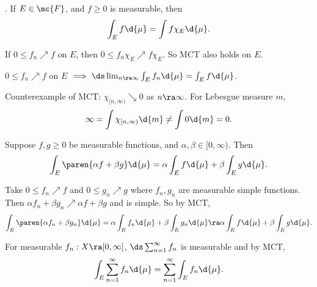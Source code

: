 \bigskip

. If \(E \in \mc{F}\), and \(f \geq 0\) is measurable, then
\[
    \int_E f \d{\mu} = \int f \chi_{E} \d{\mu}.
\]

\rmk If \(0 \leq f_n \nearrow f\) on \(E\), then \(0\leq f_n \chi_E \nearrow f \chi_E\). So MCT also holds on \(E\).
\begin{center}
    \(0\leq f_n \nearrow f\) on \(E\) \(\implies \ds \lim_{n\ra\infty} \int_E f_n \d{\mu} = \int_E f \d{\mu}\).
\end{center}

\rmk Counterexample of MCT: \(\chi_{[n, \infty)} \searrow 0\) as \(n \ra \infty\). For Lebesgue measure \(m\),
\[
    \infty = \int \chi_{[n, \infty)} \d{m} \neq \int 0 \d{m} = 0.
\]

\rmk Suppose \(f, g \geq 0\) be measurable functions, and \(\alpha, \beta \in [0, \infty)\). Then
\[
    \int_E \paren{\alpha f + \beta g} \d{\mu} = \alpha \int_E f \d{\mu} + \beta \int_E g\d{\mu}.
\]

\pf Take \(0 \leq f_n \nearrow f\) and \(0 \leq g_n\nearrow g\) where \(f_n, g_n\) are measurable simple functions. Then \(\alpha f_n + \beta g_n \nearrow \alpha f + \beta g\) and is simple. So by MCT,
\[
    \int_E \paren{\alpha f_n + \beta g_n} \d{\mu} = \alpha \int_E f_n \d{\mu} + \beta \int_E g_n \d{\mu} \ra \alpha \int_E f \d{\mu} + \beta \int_E g\d{\mu}.
\]

 For measurable \(f_n: X \ra [0, \infty]\), \(\ds \sum_{n=1}^\infty f_n\) is measurable and by MCT,
\[
    \int_E \sum_{n=1}^\infty f_n \d{\mu} = \sum_{n=1}^\infty \int_E f_n \d{\mu}.
\]

\pagebreak
